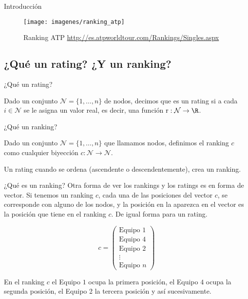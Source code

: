 \documentclass[11pt]{beamer}
\begin{document}
	\begin{frame}{Introducción}
		\begin{figure}
			\centering
			\texttt{[image: imagenes/ranking\_atp]}
			\caption{Ranking ATP \url{http://es.atpworldtour.com/Rankings/Singles.aspx}}
			\label{fig:ranking_atp}
		\end{figure}
	\end{frame}
	
	\subsection{¿Qué un rating? ¿Y un ranking?}
	
	\begin{frame}{¿Qué un rating?}
		\begin{defi}
			Dado un conjunto $\mathcal{N} = \{1,\dots, n\}$ de nodos, decimos que es un rating si a cada $i \in \mathcal{N}$ se le asigna un valor real, es decir, una función $\mathrm{r} : \mathcal{N} \to \R$.
		\end{defi}
	\end{frame}
	
	\begin{frame}{¿Qué un ranking?}
		\begin{defi} \label{def:ranking}
			Dado un conjunto $\mathcal{N} = \{1,\dots,n\}$ que llamamos nodos, definimos el ranking $c$ como cualquier biyección $c : \mathcal{N} \to \mathcal{N}$.
		\end{defi}
		
		Un rating cuando se ordena (ascendente o descendentemente), crea un ranking.
	\end{frame}
	
	\begin{frame}{¿Qué es un ranking?}
		Otra forma de ver los rankings y los ratings es en forma de vector. Si tenemos un ranking $c$, cada una de las posiciones del vector $c$, se corresponde con alguno de los nodos, y la posición en la aparezca en el vector es la posición que tiene en el ranking $c$. De igual forma para un rating.
		
		\begin{ejemplo}
			$$ c = \left(
			\begin{array}{c}
			\text{Equipo } 1 \\
			\text{Equipo } 4 \\
			\text{Equipo } 2 \\
			\vdots \\
			\text{Equipo } n
			\end{array}
			\right) $$
				
			En el ranking $c$ el Equipo $1$ ocupa la primera posición, el Equipo $4$ ocupa la segunda posición, el Equipo 2 la tercera posición y así sucesivamente.
			
		\end{ejemplo}
	\end{frame}
	
\end{document}

